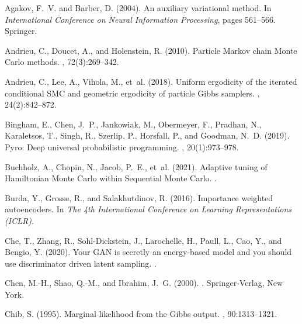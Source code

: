 \documentclass{article}
\newcommand{\1}{\mathds{1}}
\begin{document}
\begin{thebibliography}{50}

Agakov, F.~V. and Barber, D. (2004).
\newblock An auxiliary variational method.
\newblock In {\em International Conference on Neural Information Processing},
  pages 561--566. Springer.

Andrieu, C., Doucet, A., and Holenstein, R. (2010).
\newblock Particle {M}arkov chain {M}onte {C}arlo methods.
, 72(3):269--342.

Andrieu, C., Lee, A., Vihola, M., et~al. (2018).
\newblock Uniform ergodicity of the iterated conditional {SMC} and geometric
  ergodicity of particle {G}ibbs samplers.
, 24(2):842--872.

Bingham, E., Chen, J.~P., Jankowiak, M., Obermeyer, F., Pradhan, N.,
  Karaletsos, T., Singh, R., Szerlip, P., Horsfall, P., and Goodman, N.~D.
  (2019).
\newblock Pyro: Deep universal probabilistic programming.
, 20(1):973--978.

Buchholz, A., Chopin, N., Jacob, P.~E., et~al. (2021).
\newblock Adaptive tuning of {H}amiltonian {M}onte {C}arlo within {S}equential
  {M}onte {C}arlo.
.

Burda, Y., Grosse, R., and Salakhutdinov, R. (2016).
\newblock Importance weighted autoencoders.
\newblock In {\em The 4th International Conference on Learning Representations
  (ICLR)}.

Che, T., Zhang, R., Sohl-Dickstein, J., Larochelle, H., Paull, L., Cao, Y., and
  Bengio, Y. (2020).
\newblock Your {GAN} is secretly an energy-based model and you should use
  discriminator driven latent sampling.
.

Chen, M.-H., Shao, Q.-M., and Ibrahim, J.~G. (2000).
.
\newblock Springer-Verlag, New York.

Chib, S. (1995).
\newblock Marginal likelihood from the {G}ibbs output.
, 90:1313--1321.


\end{thebibliography}
\end{document}
